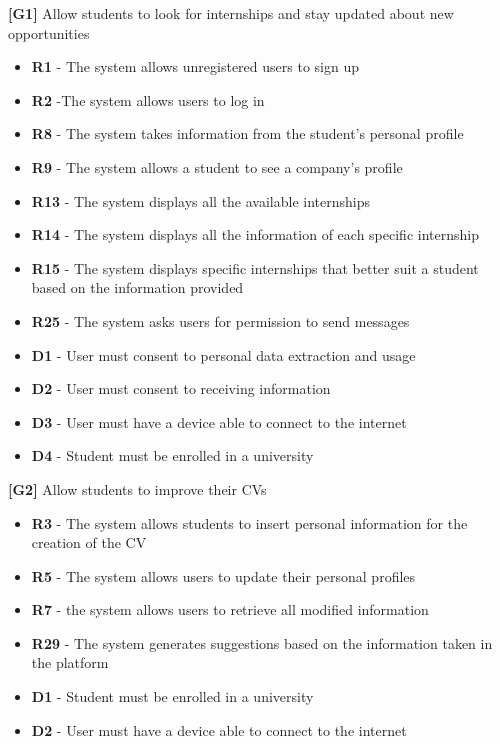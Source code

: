 \textbf{[G1]} Allow students to look for internships and stay updated about new opportunities
\begin{itemize}
    \item \textbf{R1} - The system allows unregistered users to sign up
    \item \textbf{R2} -The system allows users to log in
    \item \textbf{R8} - The system takes information from the student's personal profile
    \item \textbf{R9} - The system allows a student to see a company’s profile
    \item \textbf{R13} - The system displays all the available internships 
    \item \textbf{R14} - The system displays all the information of each specific internship
    \item \textbf{R15} - The system displays specific internships that better suit a student based on the information provided
    \item \textbf{R25} - The system asks users for permission to send messages
    \item \textbf{D1} - User must consent to personal data extraction and usage
    \item \textbf{D2} - User must consent to receiving information
    \item \textbf{D3} - User must have a device able to connect to the internet
    \item \textbf{D4} - Student must be enrolled in a university
\end{itemize}

\textbf{[G2]} Allow students to improve their CVs
\begin{itemize}
    \item \textbf{R3} - The system allows students to insert personal information for the creation of the CV
    \item \textbf{R5} - The system allows users to update their personal profiles
    \item \textbf{R7} - the system allows users to retrieve all modified information
    \item \textbf{R29} - The system generates suggestions based on the information taken in the platform
    \item \textbf{D1} - Student must be enrolled in a university
    \item \textbf{D2} - User must have a device able to connect to the internet
\end{itemize}


